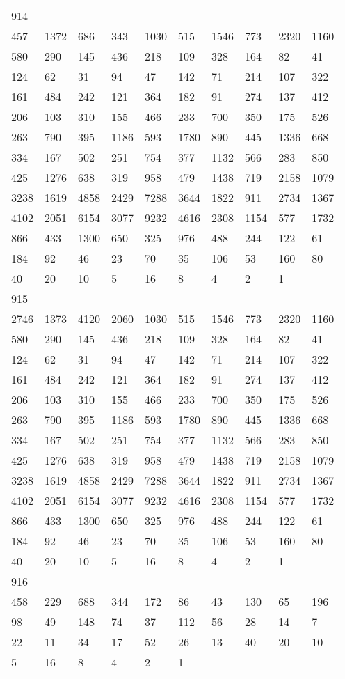 \begin{longtable}{*{10}{l}}
914&&&&&&&&&\\
457& 1372& 686& 343& 1030& 515& 1546& 773& 2320& 1160\\
580& 290& 145& 436& 218& 109& 328& 164& 82& 41\\
124& 62& 31& 94& 47& 142& 71& 214& 107& 322\\
161& 484& 242& 121& 364& 182& 91& 274& 137& 412\\
206& 103& 310& 155& 466& 233& 700& 350& 175& 526\\
263& 790& 395& 1186& 593& 1780& 890& 445& 1336& 668\\
334& 167& 502& 251& 754& 377& 1132& 566& 283& 850\\
425& 1276& 638& 319& 958& 479& 1438& 719& 2158& 1079\\
3238& 1619& 4858& 2429& 7288& 3644& 1822& 911& 2734& 1367\\
4102& 2051& 6154& 3077& 9232& 4616& 2308& 1154& 577& 1732\\
866& 433& 1300& 650& 325& 976& 488& 244& 122& 61\\
184& 92& 46& 23& 70& 35& 106& 53& 160& 80\\
40& 20& 10& 5& 16& 8& 4& 2& 1& \\

915&&&&&&&&&\\
2746& 1373& 4120& 2060& 1030& 515& 1546& 773& 2320& 1160\\
580& 290& 145& 436& 218& 109& 328& 164& 82& 41\\
124& 62& 31& 94& 47& 142& 71& 214& 107& 322\\
161& 484& 242& 121& 364& 182& 91& 274& 137& 412\\
206& 103& 310& 155& 466& 233& 700& 350& 175& 526\\
263& 790& 395& 1186& 593& 1780& 890& 445& 1336& 668\\
334& 167& 502& 251& 754& 377& 1132& 566& 283& 850\\
425& 1276& 638& 319& 958& 479& 1438& 719& 2158& 1079\\
3238& 1619& 4858& 2429& 7288& 3644& 1822& 911& 2734& 1367\\
4102& 2051& 6154& 3077& 9232& 4616& 2308& 1154& 577& 1732\\
866& 433& 1300& 650& 325& 976& 488& 244& 122& 61\\
184& 92& 46& 23& 70& 35& 106& 53& 160& 80\\
40& 20& 10& 5& 16& 8& 4& 2& 1& \\

916&&&&&&&&&\\
458& 229& 688& 344& 172& 86& 43& 130& 65& 196\\
98& 49& 148& 74& 37& 112& 56& 28& 14& 7\\
22& 11& 34& 17& 52& 26& 13& 40& 20& 10\\
5& 16& 8& 4& 2& 1& \\


\end{longtable}
